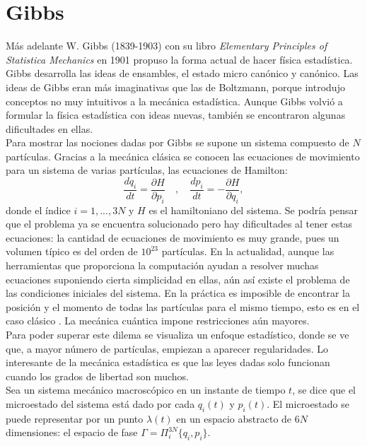 \section{Gibbs}
Más adelante W. Gibbs (1839-1903) con su libro \textit{Elementary Principles of Statistica Mechanics} en 1901 propuso la forma actual de hacer física estadística. Gibbs desarrolla las ideas de ensambles, el estado micro canónico y canónico. Las ideas de Gibbs eran más imaginativas que las de Boltzmann, porque introdujo conceptos no muy intuitivos a la mecánica estadística. Aunque Gibbs volvió a formular la física estadística con ideas nuevas, también se encontraron algunas dificultades en ellas. \\
Para mostrar las nociones dadas por Gibbs se supone un sistema compuesto de $N$ partículas. Gracias a la mecánica clásica se conocen las ecuaciones de movimiento para un sistema de varias partículas, las ecuaciones de Hamilton:
\begin{equation} \label{Hamilton}
\frac{dq_{i}}{dt}= \frac{\partial H}{\partial p_{i}} \quad , \quad \frac{d p_{i}}{dt} =-\frac{\partial H}{\partial q_{i}},
\end{equation}
donde el índice $i=1,...,3N$ y $H$ es el hamiltoniano del sistema. Se podría pensar que el problema ya se encuentra solucionado pero hay dificultades al tener estas ecuaciones: la cantidad de ecuaciones de movimiento es muy grande, pues un volumen típico es del orden de $10^{23}$ partículas. En la actualidad, aunque las herramientas que proporciona la computación ayudan a resolver muchas ecuaciones suponiendo cierta simplicidad en ellas, aún así existe el problema de las condiciones iniciales del sistema. En la práctica es imposible de encontrar la posición y el momento de todas las partículas para el mismo tiempo, esto es en el caso clásico \cite{LandauStat}. La mecánica cuántica impone restricciones aún mayores.
\\
Para poder superar este dilema se visualiza un enfoque estadístico, donde se ve que, a mayor número de partículas, empiezan a aparecer regularidades. Lo interesante de la mecánica estadística es que las leyes dadas solo funcionan cuando los grados de libertad son muchos.
\\
Sea un sistema mecánico macroscópico en un instante de tiempo $t$, se dice que el microestado del sistema está dado por cada $q_{i}(t)$ y $p_{i}(t)$. El microestado se puede representar por un punto $\lambda(t)$ en un espacio  abstracto de $6N$ dimensiones: el espacio de fase $\Gamma = \Pi^{3N}_{i} \{q_{i}, p_{i} \}$.
